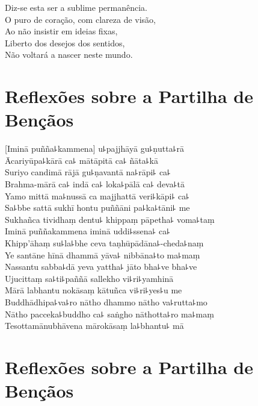 Diz-se esta ser a sublime permanência.\\
O puro de coração, com clareza de visão,\\
Ao não insistir em ideias fixas,\\
Liberto dos desejos dos sentidos,\\
Não voltará a nascer neste mundo.

\clearpage

\chapter*[Partilha de Bençãos]{Reflexões sobre a Partilha de Bençãos}

\delegateSetUseNext

\begin{leader}
\end{leader}


[Iminā puñña꜕kammena] u꜕pajjhāyā gu꜕ṇutta꜕rā\\
Ācariyūpa꜕kārā ca꜕ mātāpitā ca꜕ ñāta꜕kā\\
Suriyo candimā rājā gu꜕ṇavantā na꜕rāpi꜕ ca꜕\\
Brahma-mārā ca꜕ indā ca꜕ loka꜕pālā ca꜕ deva꜕tā\\
Yamo mittā ma꜕nussā ca majjhattā veri꜕kāpi꜕ ca꜕\\
Sa꜕bbe sattā sukhī hontu puññāni pa꜕ka꜕tāni꜕ me\\
Sukhañca tividhaṃ dentu꜕ khippaṃ pāpetha꜕ voma꜕taṃ\\
Iminā puññakammena iminā uddi꜕ssena꜕ ca꜕\\
Khipp'āhaṃ su꜕la꜕bhe ceva taṇhūpādāna꜕-cheda꜕naṃ\\
Ye santāne hīnā dhammā yāva꜕ nibbāna꜕to ma꜕maṃ\\
Nassantu sabba꜕dā yeva yattha꜕ jāto bha꜕ve bha꜕ve\\
Ujucittaṃ sa꜕ti꜕paññā sallekho vi꜕ri꜕yamhinā\\
Mārā labhantu nokāsaṃ kātuñca vi꜕ri꜕yes꜕u me\\
Buddhādhipa꜕va꜕ro nātho dhammo nātho va꜕rutta꜕mo\\
Nātho pacceka꜕buddho ca꜕ saṅgho nāthotta꜕ro ma꜕maṃ\\
Tesottamānubhāvena mārokāsaṃ la꜕bhantu꜕ mā

\clearpage

\chapter[Partilha de Bençãos]{Reflexões sobre a Partilha de Bençãos}

